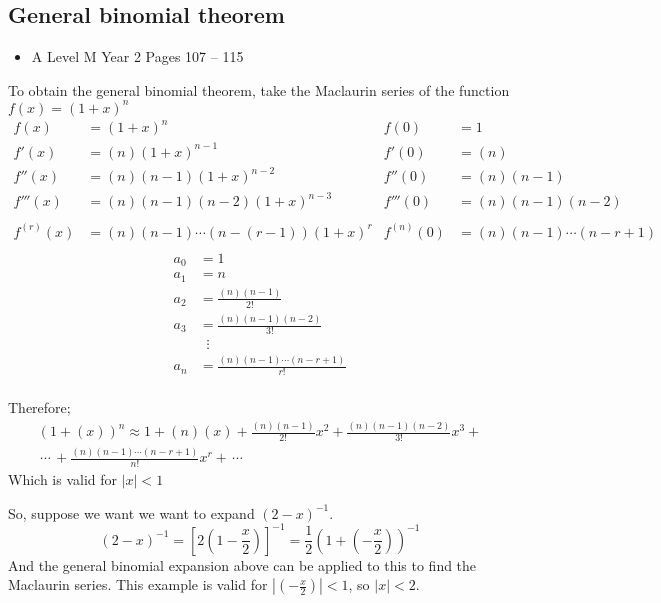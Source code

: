 \documentclass[11pt, a4paper]{article}
\begin{document}
\subsection{General binomial theorem}
\label{generalbinomialtheorem}
\begin{itemize}
\item A Level M Year 2 \hspace{1cm} \phantom{ AS / } Pages 107 -- 115
\end{itemize} \par
To obtain the general binomial theorem, take the Maclaurin series of the function $f(x)=(1+x)^{n}$
\small
\begin{align*}
f(x)&=(1+x)^{n} & f(0)&=1  \\
f'(x)&=(n)(1+x)^{n-1} & f'(0)&=(n)  \\
f''(x)&=(n)(n-1)(1+x)^{n-2} & f''(0)&=(n)(n-1)  \\
f'''(x)&=(n)(n-1)(n-2)(1+x)^{n-3} & f'''(0)&=(n)(n-1)(n-2)  \\
&&& \\
f^{(r)}(x)&=(n)(n-1)\cdots(n-(r-1))(1+x)^{r} & f^{(n)}(0)&=(n)(n-1)\cdots (n-r+1) \\
\end{align*}
\vspace{-1.2cm}
\begin{align*}
a_{0}&=1 \\
a_{1}&=n \\
a_{2}&=\frac{(n)(n-1)}{2!} \\
a_{3}&=\frac{(n)(n-1)(n-2)}{3!} \\
&\;\;\vdots \\
a_{n}&=\frac{(n)(n-1)\cdots (n-r+1)}{r!} \\
\end{align*}
\normalsize

Therefore;
\begin{multline*}
(1+(x))^{n}\approx1+(n)(x)+\frac{(n)(n-1)}{2!}x^{2}+\frac{(n)(n-1)(n-2)}{3!}x^{3}+\\ \,\cdots\, + \frac{(n)(n-1)\cdots (n-r+1)}{n!}x^{r} +\,\cdots
\end{multline*}
Which is valid for $|x|<1$ \newline \par

So, suppose we want we want to expand $(2-x)^{-1}$.
\begin{equation*}
(2-x)^{-1}=\left[ 2\left(1-\frac{x}{2}\right) \right]^{-1}=\frac{1}{2}\left(1+\left(-\frac{x}{2}\right)\right)^{-1}
\end{equation*}
And the general binomial expansion above can be applied to this to find the Maclaurin series. This example is valid for $\left| \left(-\frac{x}{2}\right)  \right|<1$, so $|x|<2$.

\vspace{0.5cm}
\end{document}

